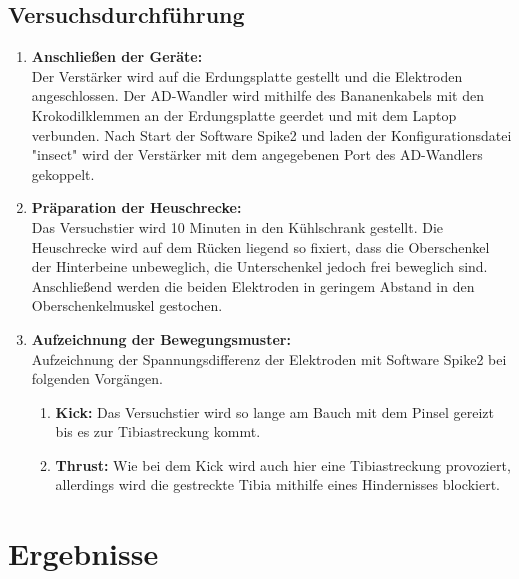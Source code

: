 \subsection{Versuchsdurchführung}
\begin{enumerate}
\item \textbf{Anschließen der Geräte:}\\ Der Verstärker wird auf die Erdungsplatte gestellt und die Elektroden angeschlossen. Der AD-Wandler wird mithilfe des Bananenkabels mit den Krokodilklemmen an der Erdungsplatte geerdet und mit dem Laptop verbunden. Nach Start der Software Spike2 und laden der Konfigurationsdatei "{}insect"{} wird der Verstärker mit dem angegebenen Port des AD-Wandlers gekoppelt.
\item \textbf{Präparation der Heuschrecke:}\\ Das Versuchstier wird 10 Minuten in den Kühlschrank gestellt. Die Heuschrecke wird auf dem Rücken liegend so fixiert, dass die Oberschenkel der Hinterbeine unbeweglich, die Unterschenkel jedoch frei beweglich sind. Anschließend werden die beiden Elektroden in geringem Abstand in den Oberschenkelmuskel gestochen. 
\item \textbf{Aufzeichnung der Bewegungsmuster:}\\
Aufzeichnung der Spannungsdifferenz der Elektroden mit Software Spike2 bei folgenden Vorgängen.
\begin{enumerate}
\item \textbf{Kick:} Das Versuchstier wird so lange am Bauch mit dem Pinsel gereizt bis es zur Tibiastreckung kommt. 
\item \textbf{Thrust:} Wie bei dem Kick wird auch hier eine Tibiastreckung provoziert, allerdings wird die gestreckte Tibia mithilfe eines Hindernisses blockiert. 
\end{enumerate}
\end{enumerate}

\section{Ergebnisse}

